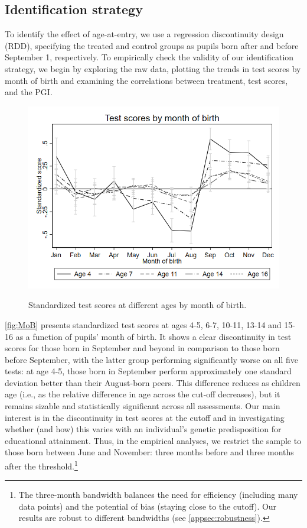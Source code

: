 \documentclass[12pt,a4paper]{article}
\begin{document}
\begin{bibunit}
\subsection{Identification strategy} 
To identify the effect of age-at-entry, we use a regression discontinuity design (RDD), specifying the treated and control groups as pupils born after and before September 1, respectively. To empirically check the validity of our identification strategy, we begin by exploring the raw data, plotting the trends in test scores by month of birth and examining the correlations between treatment, test scores, and the PGI.

\begin{figure}[ht]
\centering 
\caption{Standardized test scores at different ages by month of birth.}
\includegraphics[width=0.6\linewidth]{include/MoB.png}
\label{fig:MoB}
\end{figure}

\autoref{fig:MoB} presents standardized test scores at ages 4-5, 6-7, 10-11, 13-14 and 15-16 as a function of pupils' month of birth. It shows a clear discontinuity in test scores for those born in September and beyond in comparison to those born before September, with the latter group performing significantly worse on all five tests: at age 4-5, those born in September perform approximately one standard deviation better than their August-born peers. This difference reduces as children age (i.e., as the relative difference in age across the cut-off decreases), but it remains sizable and statistically significant across all assessments. Our main interest is in the discontinuity in test scores at the cutoff and in investigating whether (and how) this varies with an individual's genetic predisposition for educational attainment. Thus, in the empirical analyses, we restrict the sample to those born between June and November: three months before and three months after the threshold.\footnote{The three-month bandwidth balances the need for efficiency (including many data points) and the potential of bias (staying close to the cutoff). Our results are robust to different bandwidths (see  \autoref{appsec:robustness}).}  


\end{bibunit}
\end{document}

